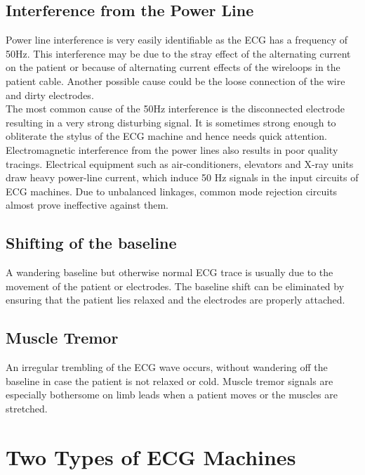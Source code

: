 \documentclass{article}
\begin{document}
\subsection{Interference from the Power Line}
Power line interference is very easily identifiable as the ECG has a frequency of 50Hz. This interference may be due to the stray effect of the alternating current on the patient or because of alternating current effects of the wireloops in the patient cable. Another possible cause could be the loose connection of the wire and dirty electrodes.\\
The most common cause of the 50Hz interference is the disconnected electrode resulting in a very strong disturbing signal. It is sometimes strong enough to obliterate the stylus of the ECG machine and hence needs quick attention.\\
Electromagnetic interference from the power lines also results in poor quality tracings. Electrical equipment such as air-conditioners, elevators and X-ray units draw heavy power-line current, which induce 50 Hz signals in the input circuits of ECG machines. Due to unbalanced linkages, common mode rejection circuits almost prove ineffective against them.
\subsection{Shifting of the baseline}
A wandering baseline but otherwise normal ECG trace is usually due to the movement of the patient or electrodes. The baseline shift can be eliminated by ensuring that the patient lies relaxed and the electrodes are properly attached. 
\subsection{Muscle Tremor}
An irregular trembling of the ECG wave occurs, without wandering off the baseline in case the patient is not relaxed or cold. Muscle tremor signals are especially bothersome on limb leads when a patient moves or the muscles are stretched. 
\section{Two Types of ECG Machines}
\end{document}
